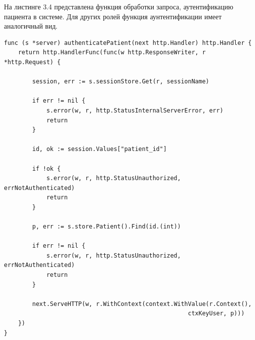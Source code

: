 %		
%			
%				
%		
%		
%		
%		

На листинге 3.4 представлена функция обработки запроса, аутентификацию пациента в системе. Для других ролей функция аунтентификации имеет аналогичный вид.

\begin{lstlisting}[caption={Аутентификация пользователя}]
func (s *server) authenticatePatient(next http.Handler) http.Handler {
	return http.HandlerFunc(func(w http.ResponseWriter, r *http.Request) {
	
		session, err := s.sessionStore.Get(r, sessionName)
		
		if err != nil {
			s.error(w, r, http.StatusInternalServerError, err)
			return
		}
		
		id, ok := session.Values["patient_id"]
		
		if !ok {
			s.error(w, r, http.StatusUnauthorized, errNotAuthenticated)
			return
		}
		
		p, err := s.store.Patient().Find(id.(int))
		
		if err != nil {
			s.error(w, r, http.StatusUnauthorized, errNotAuthenticated)
			return
		}
		
		next.ServeHTTP(w, r.WithContext(context.WithValue(r.Context(), 
													ctxKeyUser, p)))
	})
}
\end{lstlisting}

